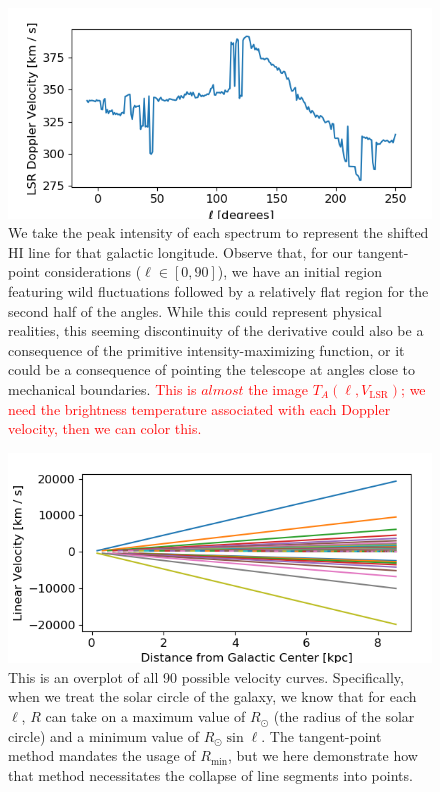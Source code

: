 \documentclass[12pt]{article}
\begin{document}
\begin{figure}
	\centering
	\includegraphics[width=.8\linewidth]{Doppler_collection}
	\caption{We take the peak intensity of each spectrum to represent the shifted HI line for that galactic longitude.  Observe that, for our tangent-point considerations ($\ell \in [0, 90]$), we have an initial region featuring wild fluctuations followed by a relatively flat region for the second half of the angles. While this could represent physical realities, this seeming discontinuity of the derivative could also be a consequence of the primitive intensity-maximizing function, or it could be a consequence of pointing the telescope at angles close to mechanical boundaries. \textcolor{red}{This is $almost$ the image $T_A(\ell, V_\text{LSR})$; we need the brightness temperature associated with each Doppler velocity, then we can color this.}}
	\label{fig:Dopp_collection}
\end{figure}

\begin{figure}
	\centering
	\includegraphics[width=.8\linewidth]{tangentPoint_dispersion}
	\caption{This is an overplot of all 90 possible velocity curves. Specifically, when we treat the solar circle of the galaxy, we know that for each $\ell$, $R$ can take on a maximum value of $R_\odot$ (the radius of the solar circle) and a minimum value of $R_\odot \sin \ell$. The tangent-point method mandates the usage of $R_\text{min}$, but we here demonstrate how that method necessitates the collapse of line segments into points.}
	\label{fig:TP_disp}
\end{figure}
\end{document}
